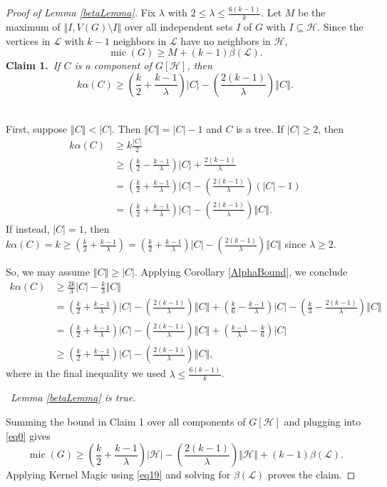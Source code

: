 \documentclass[10pt]{article}
\theoremstyle{plain}
\theoremstyle{definition}
\theoremstyle{remark}
\newcommand{\fancy}[1]{\mathcal{#1}}
\renewcommand{\L}{\fancy{L}}
\newcommand{\HH}{\fancy{H}}
\newcommand{\card}[1]{\left|#1\right|}
\newcommand{\size}[1]{\left\Vert#1\right\Vert}
\newcommand{\parens}[1]{\left( #1 \right)}
\newcommand{\mic}{\operatorname{mic}}
\newcommand{\claim}[2]{{\bf Claim #1.}~{\it #2}~~}
\begin{document}
\begin{proof}[Proof of Lemma \ref{betaLemma}]
Fix $\lambda$ with $2 \le \lambda \le \frac{6(k-1)}{k}$. Let $M$ be the maximum of $\size{I, V(G) \setminus I}$ over all independent sets $I$ of $G$ with $I \subseteq \HH$.   Since the vertices in $\L$ with $k-1$ neighbors in $\L$ have no neighbors in $\HH$,
	\begin{equation}
		\mic(G) \ge M + (k-1)\beta(\L).\label{eq0}
	\end{equation}
\claim{1}{If $C$ is a component of $G[\HH]$, then \[k\alpha(C) \ge \parens{\frac{k}{2} + \frac{k-1}{\lambda}}\card{C} - \parens{\frac{2(k-1)}{\lambda}}\size{C}.\]}

First, suppose $\size{C} < \card{C}$.  Then $\size{C} = \card{C} - 1$ and $C$ is a tree.  If $\card{C} \ge 2$, then
	\begin{align*}
		k\alpha(C) &\ge k\frac{\card{C}}{2}\\
		&\ge \parens{\frac{k}{2} - \frac{k-1}{\lambda}}\card{C} + \frac{2(k-1)}{\lambda}\\
		&=\parens{\frac{k}{2} + \frac{k-1}{\lambda}}\card{C} - \parens{\frac{2(k-1)}{\lambda}}\parens{\card{C} - 1}\\
		&=\parens{\frac{k}{2} + \frac{k-1}{\lambda}}\card{C} - \parens{\frac{2(k-1)}{\lambda}}\size{C}.
	\end{align*}
If instead, $\card{C} = 1$, then $k\alpha(C) = k \ge \parens{\frac{k}{2} + \frac{k-1}{\lambda}} = \parens{\frac{k}{2} + \frac{k-1}{\lambda}}\card{C} - \parens{\frac{2(k-1)}{\lambda}}\size{C}$ since $\lambda \ge 2$.

So, we may assume $\size{C} \ge \card{C}$.  Applying Corollary \ref{AlphaBound}, we conclude
	\begin{align*}
		k\alpha(C) &\ge \frac{2k}{3}\card{C} - \frac{k}{3}\size{C} \\
		&= \parens{\frac{k}{2} + \frac{k-1}{\lambda}}\card{C} - \parens{\frac{2(k-1)}{\lambda}}\size{C} +  \parens{\frac{k}{6} - \frac{k-1}{\lambda}}\card{C} - \parens{\frac{k}{3} - \frac{2(k-1)}{\lambda}}\size{C} \\
		&= \parens{\frac{k}{2} + \frac{k-1}{\lambda}}\card{C} - \parens{\frac{2(k-1)}{\lambda}}\size{C} +  \parens{\frac{k-1}{\lambda} -\frac{k}{6}}\card{C}\\
		&\ge \parens{\frac{k}{2} + \frac{k-1}{\lambda}}\card{C} - \parens{\frac{2(k-1)}{\lambda}}\size{C},
	\end{align*}
	where in the final inequality we used $\lambda \le \frac{6(k-1)}{k}$.
	
\smallskip

\noindent\claim{2}{Lemma \ref{betaLemma} is true.}

	Summing the bound in Claim 1 over all components of $G[\HH]$ and plugging into \eqref{eq0} gives
	\begin{equation}
	 \mic(G) \ge \parens{\frac{k}{2} + \frac{k-1}{\lambda}}\card{\HH} - \parens{\frac{2(k-1)}{\lambda}}\size{\HH} + (k-1)\beta(\L).
	 \label{eq19}
	\end{equation}
	Applying Kernel Magic using \eqref{eq19} and solving for $\beta(\L)$ proves the claim.
\end{proof}



\end{document}
